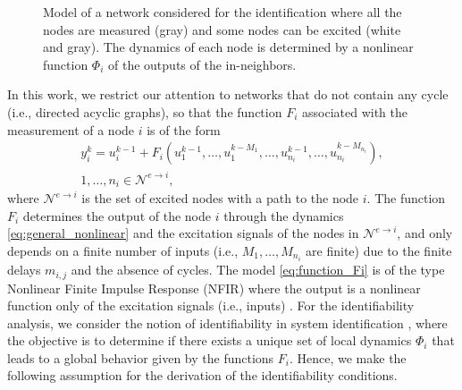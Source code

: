 \documentclass[letterpaper,10pt,journal]{IEEEtran}
\begin{document}
\begin{figure}[!t]

\normalsize


    
    \caption{Model of a network considered for the identification where all the nodes are measured (gray) and some nodes can be excited  (white and gray). The dynamics of each node is determined by a nonlinear function $\Phi_i$ of the outputs of the in-neighbors.}

    \label{fig:model}
\end{figure}


In this work, we restrict our attention to networks that do not contain any cycle (i.e., directed acyclic graphs), so that the function $F_i$ associated with the measurement of a node $i$ is of the form 
\begin{multline}\label{eq:function_Fi}
  \!\!\!\!\!  y_i^k=u_i^{k-1}+F_i(u_1^{k-1},\ldots,u_1^{k-M_1},\ldots,u_{n_i}^{k-1},\ldots,u_{n_i}^{k-M_{n_i}}),\\
    1,\dots,n_i\in \mathcal{N}^{e\to i},
\end{multline}
where $\mathcal{N}^{e\to i}$ is the set of excited nodes with a path to the \linebreak node $i$. The function $F_i$ determines the output of the node $i$ through the dynamics \eqref{eq:general_nonlinear} and the excitation signals of the nodes in $\mathcal{N}^{e\to i}$, and only depends on a finite number of inputs (i.e., $M_1,\ldots,M_{n_i}$ are finite) due to the finite delays $m_{i,j}$ and the absence of cycles. The model \eqref{eq:function_Fi}  is of the type Nonlinear Finite Impulse Response (NFIR) where the output is a nonlinear function only of the excitation signals (i.e., inputs) \cite{ramirez2021nonlinear,pillonetto2025deep}.
For the identifiability analysis, we consider the notion of identifiability in system identification \cite{ljung1999system}, where the objective is to determine if there exists a unique set of local dynamics $\Phi_i$ that leads to a global behavior given by the functions $F_i$. Hence, we make the following assumption for the derivation of the identifiability conditions.
\end{document}
